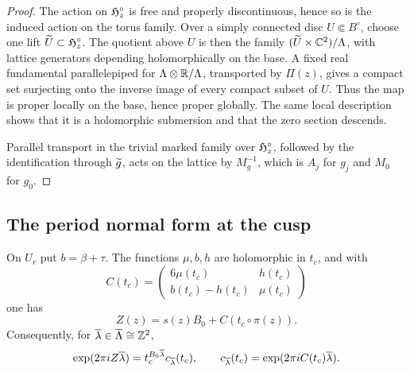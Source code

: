 \begin{proof}
The action on $\mathfrak H_z^\circ$ is free and properly discontinuous, hence so
is the induced action on the torus family.  Over a simply connected disc
$U\Subset B^\circ$, choose one lift $\widetilde U\subset\mathfrak H_z^\circ$.
The quotient above $U$ is then the family
$(\widetilde U\times\mathbb C^2)/\Lambda$, with lattice generators depending
holomorphically on the base.  A fixed real fundamental parallelepiped for
$\Lambda\otimes\mathbb R/\Lambda$, transported by $\Pi(z)$, gives a compact
set surjecting onto the inverse image of every compact subset of $U$.
Thus the map is proper locally on the base, hence proper globally.  The
same local description shows that it is a holomorphic submersion and that
the zero section descends.

Parallel transport in the trivial marked family over $\mathfrak H_z^\circ$,
followed by the identification through $\widetilde g$, acts on the lattice by
$M_g^{-1}$, which is $A_j$ for $g_j$ and $M_0$ for $g_0$.
\end{proof}

\subsection{The period normal form at the cusp}
On $U_r$ put $b=\beta+\tau$.  The functions $\mu,b,h$ are holomorphic in
$t_c$, and with
\[
 C(t_c)=
 \begin{pmatrix}
 6\mu(t_c)&h(t_c)\\
 b(t_c)-h(t_c)&\mu(t_c)
 \end{pmatrix}
\]
one has
\begin{equation}\label{eq:cusp-normal-form}
 Z(z)=s(z)B_0+C(t_c\circ\pi(z)).
\end{equation}
Consequently, for $\overline\lambda\in\overline\Lambda\cong\mathbb Z^2$,
\begin{equation}\label{eq:cusp-exponential}
 \exp(2\pi iZ\overline\lambda)
 =t_c^{B_0\overline\lambda}c_{\overline\lambda}(t_c),
 \qquad
 c_{\overline\lambda}(t_c)=\exp(2\pi iC(t_c)\overline\lambda).
\end{equation}

